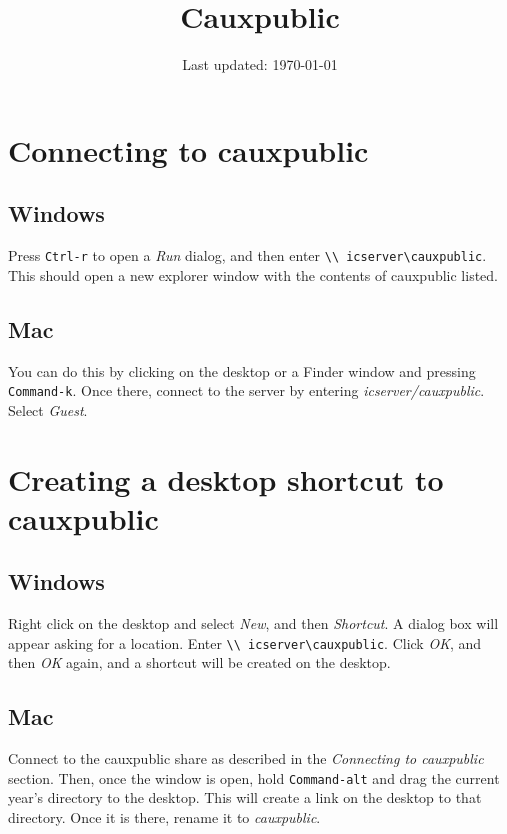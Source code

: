 \documentclass[12pt]{article}
\title{Cauxpublic}
\author{}
\date{Last updated: \today}
\begin{document}
\maketitle

\section{Connecting to cauxpublic}

\subsection{Windows}
Press \texttt{Ctrl-r} to open a \emph{Run} dialog, and then enter \texttt{\textbackslash\textbackslash
icserver\textbackslash{}cauxpublic}. This should open a new explorer window
with the contents of cauxpublic listed.

\subsection{Mac}
You can do this by clicking on the desktop or a
Finder window and pressing \texttt{Command-k}. Once there, connect to the server by
entering \emph{icserver/cauxpublic}. Select \emph{Guest}.

\section{Creating a desktop shortcut to cauxpublic}

\subsection{Windows}
Right click on the desktop and select \emph{New}, and then \emph{Shortcut}.
A dialog box will appear asking for a location. Enter \texttt{\textbackslash\textbackslash
icserver\textbackslash{}cauxpublic}. Click \emph{OK}, and then \emph{OK} again,
and a shortcut will be created on the desktop.

\subsection{Mac}
Connect to the cauxpublic share as described in the \emph{Connecting to cauxpublic}
section. Then, once the window is open, hold \texttt{Command-alt} and drag the
current year's directory to the desktop. This will create a link on the desktop
to that directory. Once it is there, rename it to \emph{cauxpublic}.
\end{document}
